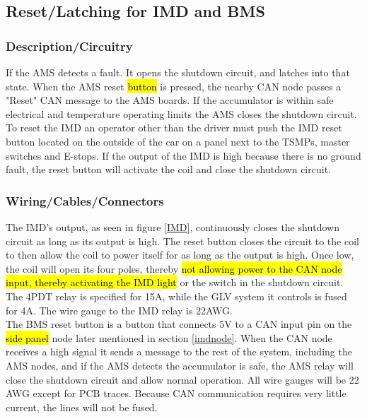 \documentclass{article}
\DeclareRobustCommand{\hlr}[1]{{\sethlcolor{red}\hl{#1}}}
\begin{document}
    \subsection{Reset/Latching for IMD and BMS}

        \subsubsection{Description/Circuitry}


            If the AMS detects a fault. It opens the shutdown circuit, and latches into that state. When the AMS reset \hlr{button} is pressed, the nearby CAN node passes a "Reset" CAN message to the AMS boards. If the accumulator is within safe electrical and temperature operating limits the AMS closes the shutdown circuit.\\

           To reset the IMD an operator other than the driver must push the IMD reset button located on the outside of the car on a panel next to the TSMPs, master switches and E-stops. If the output of the IMD is high because there is no ground fault, the reset button will activate the coil and close the shutdown circuit.

        \subsubsection{Wiring/Cables/Connectors}

            The IMD's output, as seen in figure \ref{IMD}, continuously closes the shutdown circuit as long as its output is high. The reset button closes the circuit to the coil to then allow the coil to power itself for as long as the output is high. Once low, the coil will open its four poles, thereby \hlr{not allowing power to the CAN node input, thereby activating the IMD light} or the switch in the shutdown circuit. The 4PDT relay is specified for 15A, while the GLV system it controls is fused for 4A. The wire gauge to the IMD relay is 22AWG.\\

            The BMS reset button is a button that connects 5V to a CAN input pin on the \hlr{side panel} node later mentioned in section \ref{imdnode}. When the CAN node receives a high signal it sends a message to the rest of the system, including the AMS nodes, and if the AMS detects the accumulator is safe, the AMS relay will close the shutdown circuit and allow normal operation. All wire gauges will be 22 AWG except for PCB traces. Because CAN communication requires very little current, the lines will not be fused.\\
\end{document}
